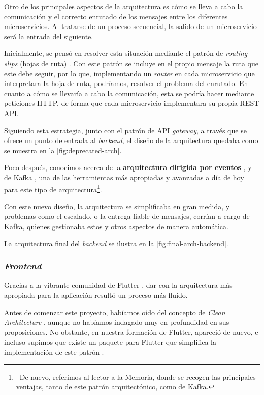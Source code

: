 Otro de los principales aspectos de la arquitectura es cómo se lleva a cabo la comunicación y el correcto enrutado de los mensajes entre los diferentes microservicios. Al tratarse de un proceso secuencial, la salido de un microservicio será la entrada del siguiente.

Inicialmente, se pensó en resolver esta situación mediante el patrón de \emph{routing-slips} (hojas de ruta) \cite{routing-slip}. Con este patrón se incluye en el propio mensaje la ruta que este debe seguir, por lo que, implementando un \emph{router} en cada microservicio que interpretara la hoja de ruta, podríamos, resolver el problema del enrutado. En cuanto a cómo se llevaría a cabo la comunicación, esta se podría hacer mediante peticiones HTTP, de forma que cada microservicio implementara su propia REST API.

Siguiendo esta estrategia, junto con el patrón de API \emph{gateway}, a través que se ofrece un punto de entrada al \emph{backend}, el diseño de la arquitectura quedaba como se muestra en la \autoref{fig:deprecated-arch}.

Poco después, conocimos acerca de la \textbf{arquitectura dirigida por eventos} \cite{event-driven}, y de Kafka \cite{apache-kafka}, una de las herramientas más apropiadas y avanzadas a día de hoy para este tipo de arquitectura\footnote{\, De nuevo, referimos al lector a la Memoria, donde se recogen las principales ventajas, tanto de este patrón arquitectónico, como de Kafka.}.

Con este nuevo diseño, la arquitectura se simplificaba en gran medida, y problemas como el escalado, o la entrega fiable de mensajes, corrían a cargo de Kafka, quienes gestionaba estos y otros aspectos de manera automática.

La arquitectura final del \emph{backend} se ilustra en la \autoref{fig:final-arch-backend}.


\subsubsection{\Large \emph{Frontend}}

Gracias a la vibrante comunidad de Flutter \cite{flutter-es}, dar con la arquitectura más apropiada para la aplicación resultó un proceso más fluido.

Antes de comenzar este proyecto, habíamos oído del concepto de \emph{Clean Architecture} \cite{martin15}, aunque no habíamos indagado muy en profundidad en sus proposiciones. No obstante, en nuestra formación de Flutter, apareció de nuevo, e incluso supimos que existe un paquete para Flutter que simplifica la implementación de este patrón \cite{flutter-clean-arch}.

